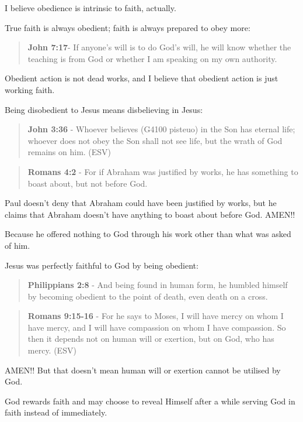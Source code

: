 \documentclass[11pt]{article}
\begin{document}
I believe obedience is intrinsic to faith, actually.

True faith is always obedient; faith is always prepared to obey more:

\begin{quote}
\textbf{John 7:17}- If anyone's will is to do God's will, he will know whether the teaching is from God or whether I am speaking on my own authority.
\end{quote}

Obedient action is not dead works, and I believe that obedient action is just working faith.

Being disobedient to Jesus means disbelieving in Jesus:

\begin{quote}
\textbf{John 3:36} - Whoever believes (G4100 pisteuo) in the Son has eternal life; whoever does not obey the Son shall not see life, but the wrath of God remains on him. (ESV)
\end{quote}

\begin{quote}
\textbf{Romans 4:2} - For if Abraham was justified by works, he has something to boast about, but not before God.
\end{quote}

Paul doesn't deny that Abraham could have been
justified by works, but he claims that Abraham
doesn't have anything to boast about before
God. AMEN!!

Because he offered nothing to God through his work other than what was asked of him.

Jesus was perfectly faithful to God by being obedient:

\begin{quote}
\textbf{Philippians 2:8} - And being found in human form, he humbled himself by becoming obedient to the point of death, even death on a cross.
\end{quote}

\begin{quote}
\textbf{Romans 9:15-16} - For he says to Moses, I will have mercy on whom I have mercy, and I will have compassion on whom I have compassion. So then it depends not on human will or exertion, but on God, who has mercy. (ESV)
\end{quote}

AMEN!! But that doesn't mean human will or exertion cannot be utilised by God.

God rewards faith and may choose to reveal Himself after a while serving God in faith instead of immediately.
\end{document}
